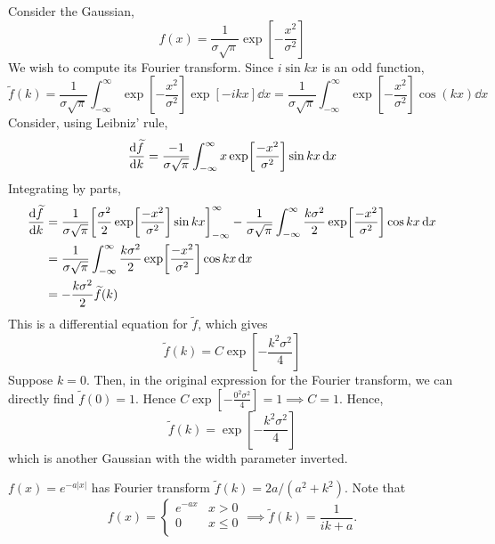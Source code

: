 \documentclass[a4paper]{article}
\begin{document}
\begin{example}
	Consider the Gaussian,
	\[
		f(x) = \frac{1}{\sigma \sqrt{\pi}} \exp[-\frac{x^2}{\sigma^2}]
	\]
	We wish to compute its Fourier transform.
	Since \( i \sin kx \) is an odd function,
	\[
		\widetilde f(k) = \frac{1}{\sigma \sqrt{\pi}} \int_{-\infty}^\infty \exp[-\frac{x^2}{\sigma^2}] \exp[-ikx] \dd{x} = \frac{1}{\sigma \sqrt{\pi}} \int_{-\infty}^\infty \exp[-\frac{x^2}{\sigma^2}] \cos(kx) \dd{x}
	\]
	Consider, using Leibniz' rule,
	\[
		\dv{\widetilde f}{k} = \frac{-1}{\sigma \sqrt{\pi}} \int_{-\infty}^\infty x\exp[\frac{-x^2}{\sigma^2}] \sin kx \dd{x}
	\]
	Integrating by parts,
	\begin{align*}
		\dv{\widetilde f}{k} & = \frac{1}{\sigma \sqrt{\pi}} \qty[\frac{\sigma^2}{2} \exp[\frac{-x^2}{\sigma^2}] \sin kx]_{-\infty}^\infty - \frac{1}{\sigma \sqrt{\pi}} \int_{-\infty}^\infty \frac{k\sigma^2}{2} \exp[\frac{-x^2}{\sigma^2}] \cos kx \dd{x} \\
		                     & = \frac{1}{\sigma \sqrt{\pi}} \int_{-\infty}^\infty \frac{k\sigma^2}{2} \exp[\frac{-x^2}{\sigma^2}] \cos kx \dd{x}                                                                                                             \\
		                     & = -\frac{k\sigma^2}{2} \widetilde f(k)
	\end{align*}
	This is a differential equation for \( \widetilde f \), which gives
	\[
		\widetilde f(k) = C \exp[-\frac{k^2\sigma^2}{4}]
	\]
	Suppose \( k = 0 \).
	Then, in the original expression for the Fourier transform, we can directly find \( \widetilde f(0) = 1 \).
	Hence \( C \exp[-\frac{0^2\sigma^2}{4}] = 1 \implies C = 1 \).
	Hence,
	\[
		\widetilde f(k) = \exp[-\frac{k^2\sigma^2}{4}]
	\]
	which is another Gaussian with the width parameter inverted.
\end{example}
\begin{example}
    $ f(x) = e^{-a |x|} $ has Fourier transform $ \widetilde{f}(k) = 2a/(a^2+k^2) $. Note that
    \[
        f(x) = \begin{cases}
        e^{-ax} &x>0\\
        0 &x\le 0\\
        \end{cases} \implies \widetilde{f}(k) = \frac{1}{ik+a}. 
    \]
\end{example}
\end{document}

